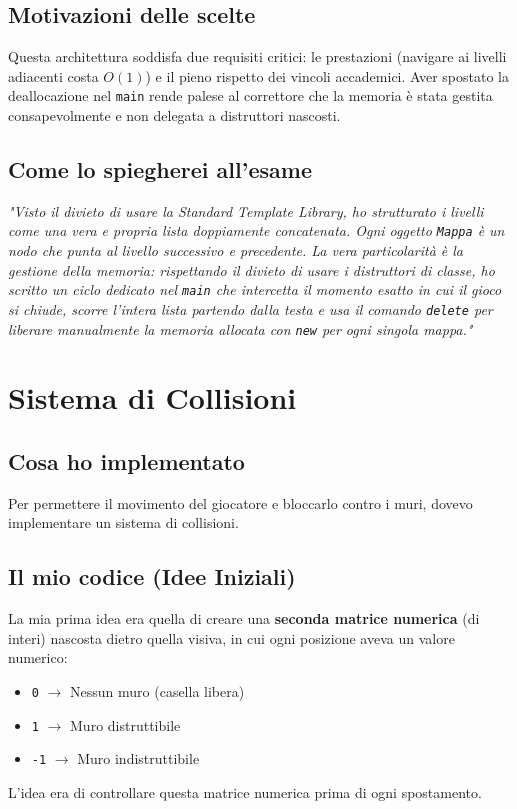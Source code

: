 \documentclass[12pt,a4paper]{article}
\begin{document}
\subsection{Motivazioni delle scelte}
Questa architettura soddisfa due requisiti critici: le prestazioni (navigare ai livelli adiacenti costa $O(1)$) e il pieno rispetto dei vincoli accademici. Aver spostato la deallocazione nel \texttt{main} rende palese al correttore che la memoria è stata gestita consapevolmente e non delegata a distruttori nascosti.

\subsection{Come lo spiegherei all'esame}
\textit{"Visto il divieto di usare la Standard Template Library, ho strutturato i livelli come una vera e propria lista doppiamente concatenata. Ogni oggetto \texttt{Mappa} è un nodo che punta al livello successivo e precedente. La vera particolarità è la gestione della memoria: rispettando il divieto di usare i distruttori di classe, ho scritto un ciclo dedicato nel \texttt{main} che intercetta il momento esatto in cui il gioco si chiude, scorre l'intera lista partendo dalla testa e usa il comando \texttt{delete} per liberare manualmente la memoria allocata con \texttt{new} per ogni singola mappa."}

\vspace{1cm}

\section{Sistema di Collisioni}

\subsection{Cosa ho implementato}
Per permettere il movimento del giocatore e bloccarlo contro i muri, dovevo implementare un sistema di collisioni. 

\subsection{Il mio codice (Idee Iniziali)}
La mia prima idea era quella di creare una \textbf{seconda matrice numerica} (di interi) nascosta dietro quella visiva, in cui ogni posizione aveva un valore numerico:
\begin{itemize}
    \item \texttt{0} $\rightarrow$ Nessun muro (casella libera)
    \item \texttt{1} $\rightarrow$ Muro distruttibile
    \item \texttt{-1} $\rightarrow$ Muro indistruttibile
\end{itemize}
L'idea era di controllare questa matrice numerica prima di ogni spostamento.
\end{document}
